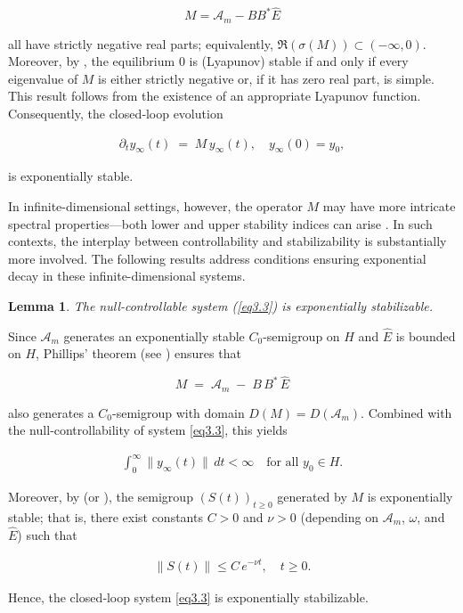 \documentclass[10pt, a4]{amsart}
\makeatletter
\theoremstyle{plain}
\newtheorem{lemma}{Lemma}[section]
\theoremstyle{definition}
\theoremstyle{remark}
\renewenvironment{proof}[1][\proofname]{\par
  \pushQED{\qed}%
  \normalfont \topsep6\p@\@plus6\p@\relax
  \trivlist
  \item[\hskip\labelsep
        \itshape
    #1\ \ref{#1}.]\ignorespaces
}{%
  \popQED\endtrivlist\@endpefalse
}
\numberwithin{equation}{section}
\makeatother
\begin{document}
$$
M = \mathcal{A}_m - B B^* \hat{E}
$$

all have strictly negative real parts; equivalently, $\Re(\sigma(M))\subset(-\infty,0)$. Moreover, by \cite[Theorem 13.1.1]{ref58}, the equilibrium $0$ is (Lyapunov) stable if and only if every eigenvalue of $M$ is either strictly negative or, if it has zero real part, is simple. This result follows from the existence of an appropriate Lyapunov function. Consequently, the closed‑loop evolution

\begin{align}
    \partial_t y_\infty(t) \;=\; M\,y_\infty(t), 
\quad y_\infty(0)=y_0,
\end{align}

is exponentially stable.

In infinite-dimensional settings, however, the operator $M$ may have more intricate spectral properties—both lower and upper stability indices can arise \cite{ref63}. In such contexts, the interplay between controllability and stabilizability is substantially more involved. The following results address conditions ensuring exponential decay in these infinite-dimensional systems.
\begin{lemma}\label{le3.8}
The null-controllable system (\ref{eq3.3}) is exponentially stabilizable.
\end{lemma}

\begin{proof}[of Lemma \ref{le3.8}]
Since $\mathcal{A}_m$ generates an exponentially stable $C_0$-semigroup on $H$ and $\hat{E}$ is bounded on $H$, Phillips’ theorem (see \cite[Theorem 1.5, p. 188]{ref37}) ensures that

$$
M \;=\;\mathcal{A}_m \;-\; B\,B^*\,\hat{E}
$$

also generates a $C_0$-semigroup with domain $D(M)=D(\mathcal{A}_m)$. Combined with the null‑controllability of system \eqref{eq3.3}, this yields

\begin{align}
    \int_{0}^{\infty}\|y_\infty(t)\|\,dt < \infty 
\quad\text{for all }y_0\in H.
\end{align}

Moreover, by \cite[Theorem 3.3(i), p.222]{ref37} (or \cite[Corollary 6.1.14]{ref48}), the semigroup $(S(t))_{t\ge0}$ generated by $M$ is exponentially stable; that is, there exist constants $C>0$ and $\nu>0$ (depending on $\mathcal{A}_m$, $\omega$, and $\hat{E}$) such that

\begin{align}
    \|S(t)\|\le C\,e^{-\nu t},\quad t\ge0.
\end{align}

Hence, the closed‑loop system \eqref{eq3.3} is exponentially stabilizable.


\end{proof}
\end{document}
